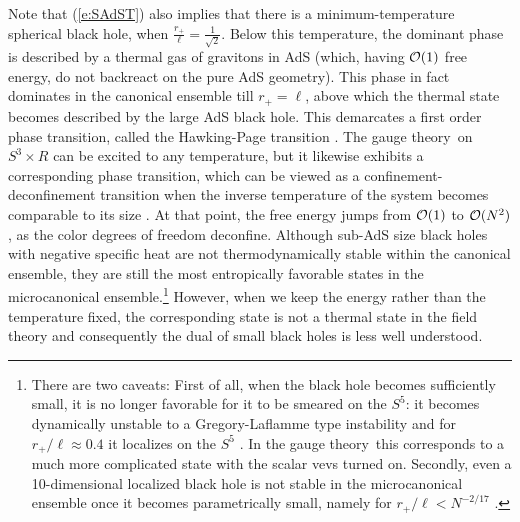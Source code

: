 \documentclass[12pt,a4paper]{article}
\def\req#1{(\ref{#1})}
\def\GT{gauge theory}
\def\Rads{\ell}
\def\rh{r_+}
\begin{document}
Note that \req{e:SAdST} also implies that there is a minimum-temperature spherical black hole, when  $\frac{\rh}{\Rads} = \frac{1}{\sqrt{2}}$. Below this temperature, the dominant phase is described by a thermal gas of gravitons in AdS (which, having ${\cal O}(1)$ free energy, do not backreact on the pure AdS geometry).  This phase in fact dominates in the canonical ensemble till $\rh = \Rads$, above which the thermal state becomes described by the large AdS black hole.  This demarcates a first order phase transition, called the Hawking-Page transition \cite{Hawking:1982dh}.  
The \GT\ on $S^3 \times R$ can be excited to any temperature, but it likewise exhibits a corresponding phase transition, which can be viewed as a confinement-deconfinement  transition when the inverse temperature of the system becomes comparable to its size \cite{Witten:1998zw}.  At that point, the free energy jumps from ${\cal O}(1)$ 
 to ${\cal O}(N^2)$,  as the color degrees of freedom deconfine. 
Although sub-AdS size black holes with negative specific heat are not thermodynamically stable within the canonical ensemble, they are still the most entropically favorable states in the microcanonical ensemble.\footnote{
There are two caveats:  First of all, when the black hole becomes sufficiently small, it is no longer favorable for it to be smeared on the $S^5$: it becomes dynamically unstable to a Gregory-Laflamme type instability  \cite{Gregory:1993vy} and for $\rh/\Rads \approx 0.4$ it localizes on the $S^5$ \cite{Hubeny:2002xn}.  In the \GT\ this corresponds to a much more complicated state with the scalar vevs turned on.  Secondly, even  a 10-dimensional localized  black hole is not stable in the microcanonical ensemble once it becomes parametrically small, namely for $\rh/\Rads < N^{-2/17} $ \cite{Horowitz:1999uv}.
}  
However, when we keep the energy rather than the temperature fixed, the corresponding state is not a thermal state in the field theory and consequently the dual of small black holes is less well understood.
\end{document}
